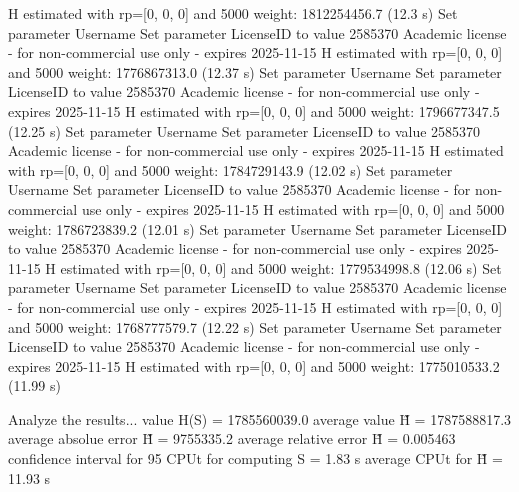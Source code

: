   H estimated with rp=[0, 0, 0] and 5000 weight:  1812254456.7  (12.3 s)
Set parameter Username
Set parameter LicenseID to value 2585370
Academic license - for non-commercial use only - expires 2025-11-15
  H estimated with rp=[0, 0, 0] and 5000 weight:  1776867313.0  (12.37 s)
Set parameter Username
Set parameter LicenseID to value 2585370
Academic license - for non-commercial use only - expires 2025-11-15
  H estimated with rp=[0, 0, 0] and 5000 weight:  1796677347.5  (12.25 s)
Set parameter Username
Set parameter LicenseID to value 2585370
Academic license - for non-commercial use only - expires 2025-11-15
  H estimated with rp=[0, 0, 0] and 5000 weight:  1784729143.9  (12.02 s)
Set parameter Username
Set parameter LicenseID to value 2585370
Academic license - for non-commercial use only - expires 2025-11-15
  H estimated with rp=[0, 0, 0] and 5000 weight:  1786723839.2  (12.01 s)
Set parameter Username
Set parameter LicenseID to value 2585370
Academic license - for non-commercial use only - expires 2025-11-15
  H estimated with rp=[0, 0, 0] and 5000 weight:  1779534998.8  (12.06 s)
Set parameter Username
Set parameter LicenseID to value 2585370
Academic license - for non-commercial use only - expires 2025-11-15
  H estimated with rp=[0, 0, 0] and 5000 weight:  1768777579.7  (12.22 s)
Set parameter Username
Set parameter LicenseID to value 2585370
Academic license - for non-commercial use only - expires 2025-11-15
  H estimated with rp=[0, 0, 0] and 5000 weight:  1775010533.2  (11.99 s)

Analyze the results...
  value H(S)                  = 1785560039.0 
  average value H̃             = 1787588817.3 
  average absolue error H̃     = 9755335.2 
  average relative error H̃    = 0.005463 
  confidence interval for 95%
  CPUt for computing S         = 1.83 s
  average CPUt for H̃           = 11.93 s

